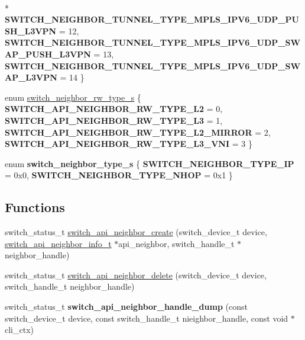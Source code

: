 \begin{DoxyCompactItemize}
\\*
{\bfseries S\+W\+I\+T\+C\+H\+\_\+\+N\+E\+I\+G\+H\+B\+O\+R\+\_\+\+T\+U\+N\+N\+E\+L\+\_\+\+T\+Y\+P\+E\+\_\+\+M\+P\+L\+S\+\_\+\+I\+P\+V6\+\_\+\+U\+D\+P\+\_\+\+P\+U\+S\+H\+\_\+\+L3\+V\+P\+N} = 12, 
{\bfseries S\+W\+I\+T\+C\+H\+\_\+\+N\+E\+I\+G\+H\+B\+O\+R\+\_\+\+T\+U\+N\+N\+E\+L\+\_\+\+T\+Y\+P\+E\+\_\+\+M\+P\+L\+S\+\_\+\+I\+P\+V6\+\_\+\+U\+D\+P\+\_\+\+S\+W\+A\+P\+\_\+\+P\+U\+S\+H\+\_\+\+L3\+V\+P\+N} = 13, 
{\bfseries S\+W\+I\+T\+C\+H\+\_\+\+N\+E\+I\+G\+H\+B\+O\+R\+\_\+\+T\+U\+N\+N\+E\+L\+\_\+\+T\+Y\+P\+E\+\_\+\+M\+P\+L\+S\+\_\+\+I\+P\+V6\+\_\+\+U\+D\+P\+\_\+\+S\+W\+A\+P\+\_\+\+L3\+V\+P\+N} = 14
 \}
\item 
enum \hyperlink{group__ARP_ga731fa1e12488772adc0b26c05c6b7b1c}{switch\+\_\+neighbor\+\_\+rw\+\_\+type\+\_\+s} \{ {\bfseries S\+W\+I\+T\+C\+H\+\_\+\+A\+P\+I\+\_\+\+N\+E\+I\+G\+H\+B\+O\+R\+\_\+\+R\+W\+\_\+\+T\+Y\+P\+E\+\_\+\+L2} = 0, 
{\bfseries S\+W\+I\+T\+C\+H\+\_\+\+A\+P\+I\+\_\+\+N\+E\+I\+G\+H\+B\+O\+R\+\_\+\+R\+W\+\_\+\+T\+Y\+P\+E\+\_\+\+L3} = 1, 
{\bfseries S\+W\+I\+T\+C\+H\+\_\+\+A\+P\+I\+\_\+\+N\+E\+I\+G\+H\+B\+O\+R\+\_\+\+R\+W\+\_\+\+T\+Y\+P\+E\+\_\+\+L2\+\_\+\+M\+I\+R\+R\+O\+R} = 2, 
{\bfseries S\+W\+I\+T\+C\+H\+\_\+\+A\+P\+I\+\_\+\+N\+E\+I\+G\+H\+B\+O\+R\+\_\+\+R\+W\+\_\+\+T\+Y\+P\+E\+\_\+\+L3\+\_\+\+V\+N\+I} = 3
 \}
\item 
\hypertarget{group__ARP_gaa98904b3ae0e46e78109600867eabd92}{enum {\bfseries switch\+\_\+neighbor\+\_\+type\+\_\+s} \{ {\bfseries S\+W\+I\+T\+C\+H\+\_\+\+N\+E\+I\+G\+H\+B\+O\+R\+\_\+\+T\+Y\+P\+E\+\_\+\+I\+P} = 0x0, 
{\bfseries S\+W\+I\+T\+C\+H\+\_\+\+N\+E\+I\+G\+H\+B\+O\+R\+\_\+\+T\+Y\+P\+E\+\_\+\+N\+H\+O\+P} = 0x1
 \}}\label{group__ARP_gaa98904b3ae0e46e78109600867eabd92}

\end{DoxyCompactItemize}
\subsection*{Functions}
\begin{DoxyCompactItemize}
\item 
switch\+\_\+status\+\_\+t \hyperlink{group__ARP_gaece59d35183672cc20fadd577e425883}{switch\+\_\+api\+\_\+neighbor\+\_\+create} (switch\+\_\+device\+\_\+t device, \hyperlink{group__ARP_gabec2e5422f9b1b796d495f8b9bbd7bc9}{switch\+\_\+api\+\_\+neighbor\+\_\+info\+\_\+t} $\ast$api\+\_\+neighbor, switch\+\_\+handle\+\_\+t $\ast$neighbor\+\_\+handle)
\item 
switch\+\_\+status\+\_\+t \hyperlink{group__ARP_ga385fb65769cf7b6a62ba786b05a45057}{switch\+\_\+api\+\_\+neighbor\+\_\+delete} (switch\+\_\+device\+\_\+t device, switch\+\_\+handle\+\_\+t neighbor\+\_\+handle)
\item 
\hypertarget{group__ARP_ga26975929c1c222887e2306869337fa7b}{switch\+\_\+status\+\_\+t {\bfseries switch\+\_\+api\+\_\+neighbor\+\_\+handle\+\_\+dump} (const switch\+\_\+device\+\_\+t device, const switch\+\_\+handle\+\_\+t nieighbor\+\_\+handle, const void $\ast$cli\+\_\+ctx)}\label{group__ARP_ga26975929c1c222887e2306869337fa7b}

\end{DoxyCompactItemize}


